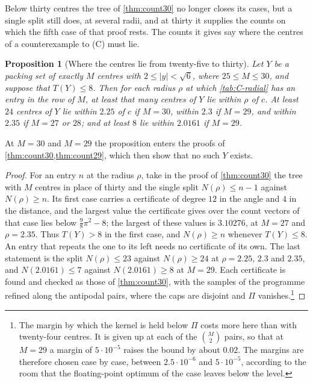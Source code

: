 \documentclass[11pt,reqno]{amsart}
\renewcommand{\_}{\origunderscore\allowbreak}
\numberwithin{equation}{section}
\theoremstyle{plain}
\newtheorem{prop}[thm]{Proposition}
\theoremstyle{definition}
\theoremstyle{remark}
\begin{document}
Below thirty centres the tree of \cref{thm:count30} no longer closes its
cases, but a single split still does, at several radii, and at thirty it
supplies the counts on which the fifth case of that proof rests. The counts
it gives say where the centres of a counterexample to (C) must lie.

\begin{prop}[Where the centres lie from twenty-five to thirty]\label{prop:C-radial}
Let $Y$ be a packing set of exactly $M$ centres with $2\le|y|<\sqrt6$, where
$25\le M\le30$, and suppose that $T(Y)\le8$. Then for each radius $\rho$ at
which \cref{tab:C-radial} has an entry in the row of $M$, at least that many
centres of $Y$ lie within $\rho$ of $c$. At least $24$ centres of $Y$ lie
within $2.25$ of $c$ if $M=30$, within $2.3$ if $M=29$, and within $2.35$
if $M=27$ or $28$; and at least $8$ lie within $2.0161$ if $M=29$.
\end{prop}

At $M=30$ and $M=29$ the proposition enters the proofs of
\cref{thm:count30,thm:count29}, which then show that no such $Y$ exists.

\begin{proof}
For an entry $n$ at the radius $\rho$, take in the proof of
\cref{thm:count30} the tree with $M$ centres in place of thirty and the
single split $N(\rho)\le n-1$ against $N(\rho)\ge n$. Its first case carries a certificate of degree $12$
in the angle and $4$ in the distance, and the largest value the certificate
gives over the count vectors of that case lies below $\frac98\pi^2-8$; the
largest of these values is $3.10276$, at $M=27$ and $\rho=2.35$. Thus $T(Y)>8$ in
the first case, and $N(\rho)\ge n$ whenever $T(Y)\le8$. An entry that
repeats the one to its left needs no certificate of its own. The last
statement is the split $N(\rho)\le23$ against $N(\rho)\ge24$ at $\rho=2.25$,
$2.3$ and $2.35$, and $N(2.0161)\le7$ against $N(2.0161)\ge8$ at $M=29$. Each
certificate is found and checked as those of \cref{thm:count30}, with the
samples of the programme refined along the antipodal pairs, where the caps
are disjoint and $\Pi$ vanishes.\footnote{The margin
by which the kernel is held below $\Pi$ costs more here than with
twenty-four centres. It is given up at each of the $\binom M2$ pairs, so
that at $M=29$ a margin of $5\cdot10^{-5}$ raises the bound by about
$0.02$. The margins are therefore chosen
case by case, between $2.5\cdot10^{-6}$ and $5\cdot10^{-5}$, according to
the room that the floating-point optimum of the case leaves below the
level.}
\end{proof}
\end{document}
